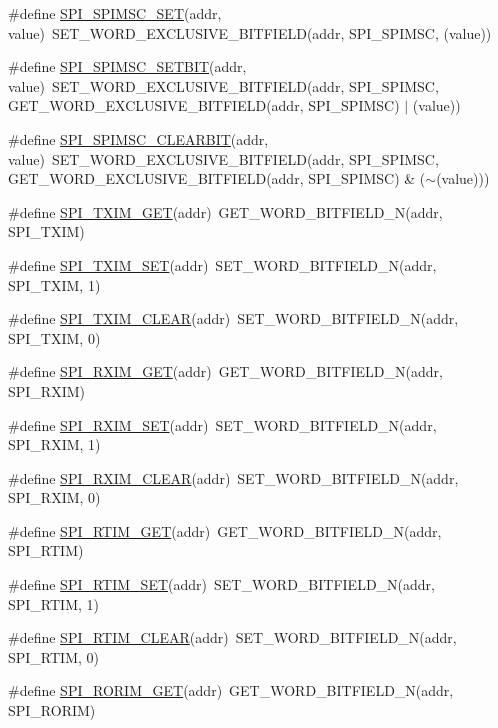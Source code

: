 \begin{DoxyCompactItemize}
\item 
\#define \hyperlink{a00572_af88d943a70858f889b6311553f1f5310}{SPI\_\-SPIMSC\_\-SET}(addr, value)~SET\_\-WORD\_\-EXCLUSIVE\_\-BITFIELD(addr, SPI\_\-SPIMSC, (value))
\item 
\#define \hyperlink{a00572_aab7932ae7f700f56bb0cf2484d5c9bf3}{SPI\_\-SPIMSC\_\-SETBIT}(addr, value)~SET\_\-WORD\_\-EXCLUSIVE\_\-BITFIELD(addr, SPI\_\-SPIMSC, GET\_\-WORD\_\-EXCLUSIVE\_\-BITFIELD(addr, SPI\_\-SPIMSC) $|$ (value))
\item 
\#define \hyperlink{a00572_a2eadbf5b0338c76d7d140a37e3a27557}{SPI\_\-SPIMSC\_\-CLEARBIT}(addr, value)~SET\_\-WORD\_\-EXCLUSIVE\_\-BITFIELD(addr, SPI\_\-SPIMSC, GET\_\-WORD\_\-EXCLUSIVE\_\-BITFIELD(addr, SPI\_\-SPIMSC) \& ($\sim$(value)))
\item 
\#define \hyperlink{a00572_ae8b34889acfb072f01ccf7ce0e48339b}{SPI\_\-TXIM\_\-GET}(addr)~GET\_\-WORD\_\-BITFIELD\_\-N(addr, SPI\_\-TXIM)
\item 
\#define \hyperlink{a00572_aba5e2139688416c762ab4ea54176edc3}{SPI\_\-TXIM\_\-SET}(addr)~SET\_\-WORD\_\-BITFIELD\_\-N(addr, SPI\_\-TXIM, 1)
\item 
\#define \hyperlink{a00572_a90607b3a709edfa839fd8df7f1eeadaa}{SPI\_\-TXIM\_\-CLEAR}(addr)~SET\_\-WORD\_\-BITFIELD\_\-N(addr, SPI\_\-TXIM, 0)
\item 
\#define \hyperlink{a00572_aca98f2c22169ebc5998295c417c89ec2}{SPI\_\-RXIM\_\-GET}(addr)~GET\_\-WORD\_\-BITFIELD\_\-N(addr, SPI\_\-RXIM)
\item 
\#define \hyperlink{a00572_aebf3d00f6a2744770605efd3e85e89c4}{SPI\_\-RXIM\_\-SET}(addr)~SET\_\-WORD\_\-BITFIELD\_\-N(addr, SPI\_\-RXIM, 1)
\item 
\#define \hyperlink{a00572_a771bbb2ab447248dfd8212210baa291b}{SPI\_\-RXIM\_\-CLEAR}(addr)~SET\_\-WORD\_\-BITFIELD\_\-N(addr, SPI\_\-RXIM, 0)
\item 
\#define \hyperlink{a00572_a716422e5f76f90f38559d04a11cd0140}{SPI\_\-RTIM\_\-GET}(addr)~GET\_\-WORD\_\-BITFIELD\_\-N(addr, SPI\_\-RTIM)
\item 
\#define \hyperlink{a00572_a9083af74dd1a2e6a332467578e9ac0ce}{SPI\_\-RTIM\_\-SET}(addr)~SET\_\-WORD\_\-BITFIELD\_\-N(addr, SPI\_\-RTIM, 1)
\item 
\#define \hyperlink{a00572_ab656a15f58bd41872534e28efa723e5d}{SPI\_\-RTIM\_\-CLEAR}(addr)~SET\_\-WORD\_\-BITFIELD\_\-N(addr, SPI\_\-RTIM, 0)
\item 
\#define \hyperlink{a00572_a07af8d9314a06b115ca11ba4c1b20fa2}{SPI\_\-RORIM\_\-GET}(addr)~GET\_\-WORD\_\-BITFIELD\_\-N(addr, SPI\_\-RORIM)

\end{DoxyCompactItemize}
